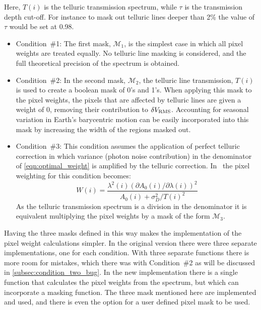 Here, \(T(i)\) is the telluric transmission spectrum, while \(\tau\) is the transmission depth cut-off.
For instance to mask out telluric lines deeper than 2\% the value of \(\tau\) would be set at 0.98.

\begin{itemize}
    \setlength\itemsep{-0.2em} %
    \item Condition~\#1:
    The first mask, \({\mathcal{M}}_{1}\), is the simplest case in which all pixel weights are treated equally.
    No telluric line masking is considered, and the full theoretical precision of the spectrum is obtained.
    
    \item Condition~\#2:
    In the second mask, \({\mathcal{M}}_{2}\), the telluric line transmission, \(T(i)\) is used to create a boolean mask of 0's and 1's.
    When applying this mask to the pixel weights, the pixels that are affected by telluric lines are given a weight of 0, removing their contribution to \(\delta {V}_{\textrm{RMS}}\).
    Accounting for seasonal variation in Earth's barycentric motion can be easily incorporated into this mask by increasing the width of the regions masked out.
    
    \item Condition~\#3:
    This condition assumes the application of perfect telluric correction in which variance (photon noise contribution) in the denominator of \cref{eqn:optimal_weight} is amplified by the telluric correction.
    In~\citep{figueira_radial_2016} the pixel weighting for this condition becomes:
    \begin{equation}
    W(i) = \frac{{\lambda}^{2}(i) {({\partial {A}_{0}(i)}/{\partial \lambda(i)})}^{2}}{A_0(i) + {\sigma}^{2}_{D}/{T(i)}^{2}} \label{eqn:optimal_weight_transmission}
    \end{equation}
    As the telluric transmission spectrum is a division in the denominator it is equivalent multiplying the pixel weights by a mask of the form \({\mathcal{M}}_{3}\).
\end{itemize}

Having the three masks defined in this way makes the implementation of the pixel weight calculations simpler.
In the original version there were three separate implementations, one for each condition.
With three separate functions there is more room for mistakes, which there was with Condition~\#2 as will be discussed in \cref{subsec:condition_two_bug}.
In the new implementation there is a single function that calculates the pixel weights from the spectrum, but which can incorporate a masking function.
The three mask mentioned here are implemented and used, and there is even the option for a user defined pixel mask to be used.



